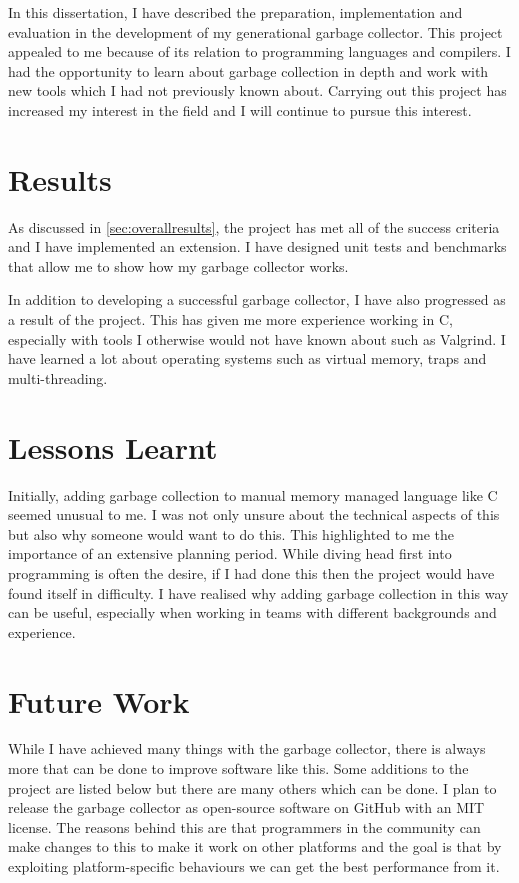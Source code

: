 \documentclass[../diss.tex]{subfiles}
\begin{document}
In this dissertation, I have described the preparation, implementation and evaluation in the development of my generational garbage collector. This project appealed to me because of its relation to programming languages and compilers. I had the opportunity to learn about garbage collection in depth and work with new tools which I had not previously known about. Carrying out this project has increased my interest in the field and I will continue to pursue this interest.

\section{Results}

As discussed in \cref{sec:overallresults}, the project has met all of the success criteria and I have implemented an extension. I have designed unit tests and benchmarks that allow me to show how my garbage collector works. 

In addition to developing a successful garbage collector, I have also progressed as a result of the project. This has given me more experience working in C, especially with tools I otherwise would not have known about such as Valgrind. I have learned a lot about operating systems such as virtual memory, traps and multi-threading.

\section{Lessons Learnt}

Initially, adding garbage collection to manual memory managed language like C seemed unusual to me. I was not only unsure about the technical aspects of this but also why someone would want to do this. This highlighted to me the importance of an extensive planning period. While diving head first into programming is often the desire, if I had done this then the project would have found itself in difficulty. I have realised why adding garbage collection in this way can be useful, especially when working in teams with different backgrounds and experience.

\section{Future Work} \label{sec:futurework}

While I have achieved many things with the garbage collector, there is always more that can be done to improve software like this. Some additions to the project are listed below but there are many others which can be done. I plan to release the garbage collector as open-source software on GitHub with an MIT license. The reasons behind this are that programmers in the community can make changes to this to make it work on other platforms and the goal is that by exploiting platform-specific behaviours we can get the best performance from it.
\end{document}
